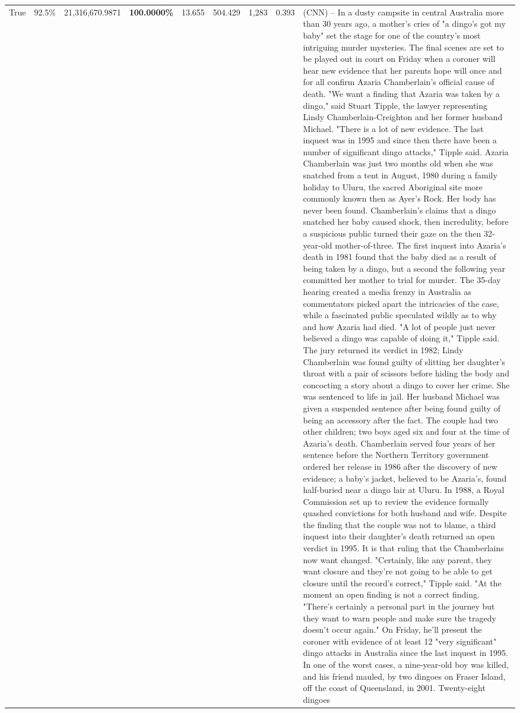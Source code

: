 \begin{table}[H]
\begin{tabular}{lllrlllll}
True & 92.5\% & 21,316,670.9871 & \bfseries \color{red} 100.0000\% & 13.655 & 504.429 & 1,283 & 0.393 & (CNN) -- In a dusty campsite in central Australia more than 30 years ago, a mother's cries of "a dingo's got my baby" set the stage for one of the country's most intriguing murder mysteries. The final scenes are set to be played out in court on Friday when a coroner will hear new evidence that her parents hope will once and for all confirm Azaria Chamberlain's official cause of death. "We want a finding that Azaria was taken by a dingo," said Stuart Tipple, the lawyer representing Lindy Chamberlain-Creighton and her former husband Michael. "There is a lot of new evidence. The last inquest was in 1995 and since then there have been a number of significant dingo attacks," Tipple said. Azaria Chamberlain was just two months old when she was snatched from a tent in August, 1980 during a family holiday to Uluru, the sacred Aboriginal site more commonly known then as Ayer's Rock. Her body has never been found. Chamberlain's claims that a dingo snatched her baby caused shock, then incredulity, before a suspicious public turned their gaze on the then 32-year-old mother-of-three. The first inquest into Azaria's death in 1981 found that the baby died as a result of being taken by a dingo, but a second the following year committed her mother to trial for murder. The 35-day hearing created a media frenzy in Australia as commentators picked apart the intricacies of the case, while a fascinated public speculated wildly as to why and how Azaria had died. "A lot of people just never believed a dingo was capable of doing it," Tipple said. The jury returned its verdict in 1982; Lindy Chamberlain was found guilty of slitting her daughter's throat with a pair of scissors before hiding the body and concocting a story about a dingo to cover her crime. She was sentenced to life in jail. Her husband Michael was given a suspended sentence after being found guilty of being an accessory after the fact. The couple had two other children; two boys aged six and four at the time of Azaria's death. Chamberlain served four years of her sentence before the Northern Territory government ordered her release in 1986 after the discovery of new evidence; a baby's jacket, believed to be Azaria's, found half-buried near a dingo lair at Uluru. In 1988, a Royal Commission set up to review the evidence formally quashed convictions for both husband and wife. Despite the finding that the couple was not to blame, a third inquest into their daughter's death returned an open verdict in 1995. It is that ruling that the Chamberlains now want changed. "Certainly, like any parent, they want closure and they're not going to be able to get closure until the record's correct," Tipple said. "At the moment an open finding is not a correct finding. "There's certainly a personal part in the journey but they want to warn people and make sure the tragedy doesn't occur again." On Friday, he'll present the coroner with evidence of at least 12 "very significant" dingo attacks in Australia since the last inquest in 1995. In one of the worst cases, a nine-year-old boy was killed, and his friend mauled, by two dingoes on Fraser Island, off the coast of Queensland, in 2001. Twenty-eight dingoes 
\end{tabular}
\end{table}
